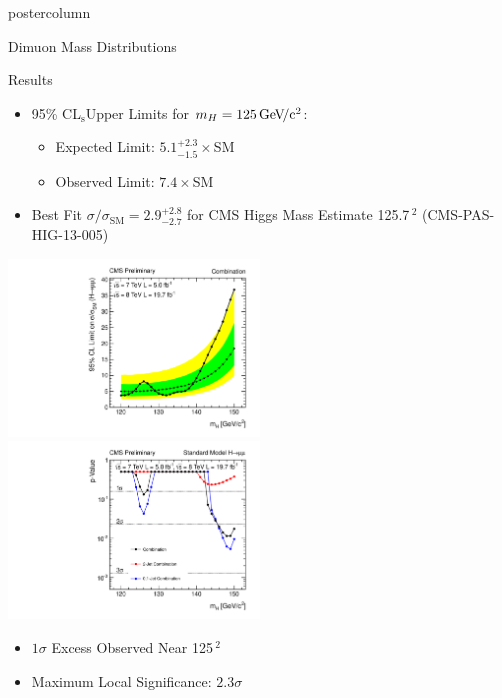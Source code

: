 \documentclass[final,hyperref={pdfpagelabels=false}]{beamer}
\newcommand{\GeVcc}{\,\text{Ge\kern -0.1em  V\!/c}\ensuremath{\mathrm{^2}}}
\newcommand{\cls}{CL$\mathrm{_s}$}
\begin{document}
\begin{frame}
\begin{columns}
\begin{column}{.49\textwidth}
\begin{beamercolorbox}[center,wd=\textwidth]{postercolumn}
\begin{minipage}[T]{.95\textwidth}
{\begin{block}{Dimuon Mass Distributions}
\begin{center}
              \end{center}
            \end{block}
            \vfill
            \begin{block}{Results}
              \begin{itemize}
                \item 95\% \cls Upper Limits for $m_H = 125 \GeVcc{}$:
                \begin{itemize}
                  \item Expected Limit: $5.1^{+2.3}_{-1.5}\times$SM
                  \item Observed Limit: $7.4\times$SM
                \end{itemize}              
                \item Best Fit $\sigma/\sigma_{\mathrm{SM}}=2.9^{+2.8}_{-2.7}$ for CMS Higgs Mass Estimate 125.7\GeVcc{} (CMS-PAS-HIG-13-005)
              \end{itemize}              
              \begin{center}
                \includegraphics[width=0.5\textwidth]{plotsPublic/limits_annalysisA/pdf/CombSplitAll_7P8TeV.pdf}
                \includegraphics[width=0.5\textwidth]{plotsPublic/pValues_analysisA/pdf/pValues_Final7P8TeV.pdf}
              \end{center}
              \begin{itemize}
                \item $1\sigma$ Excess Observed Near 125\GeVcc{}
                \item Maximum Local Significance: $2.3\sigma$

\end{itemize}
\end{block}}
\end{minipage}
\end{beamercolorbox}
\end{column}
\end{columns}
\end{frame}
\end{document}
